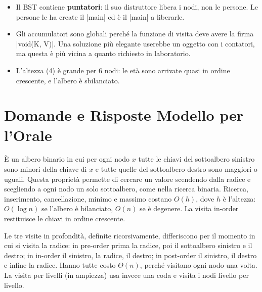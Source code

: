 \begin{consiglio}
\begin{itemize}
  \item Il BST contiene \textbf{puntatori}: il suo distruttore libera i nodi, non le
        persone. Le persone le ha create il \cc|main| ed è il \cc|main| a liberarle.
  \item Gli accumulatori sono globali perché la funzione di visita deve avere la firma
        \cc|void(K, V)|. Una soluzione più elegante userebbe un oggetto con i contatori,
        ma questa è più vicina a quanto richiesto in laboratorio.
  \item L'altezza (4) è grande per 6 nodi: le età sono arrivate quasi in ordine crescente,
        e l'albero è sbilanciato.
\end{itemize}
\end{consiglio}

\section{Domande e Risposte Modello per l'Orale}

\begin{orale}
È un albero binario in cui per ogni nodo $x$ tutte le chiavi del sottoalbero sinistro sono
minori della chiave di $x$ e tutte quelle del sottoalbero destro sono maggiori o uguali.
Questa proprietà permette di cercare un valore scendendo dalla radice e scegliendo a ogni
nodo un solo sottoalbero, come nella ricerca binaria. Ricerca, inserimento, cancellazione,
minimo e massimo costano $O(h)$, dove $h$ è l'altezza: $O(\log n)$ se l'albero è bilanciato,
$O(n)$ se è degenere. La visita in-order restituisce le chiavi in ordine crescente.
\end{orale}

\begin{orale}
Le tre visite in profondità, definite ricorsivamente, differiscono per il momento in cui si
visita la radice: in pre-order prima la radice, poi il sottoalbero sinistro e il destro; in
in-order il sinistro, la radice, il destro; in post-order il sinistro, il destro e infine la
radice. Hanno tutte costo $\Theta(n)$, perché visitano ogni nodo una volta. La visita per
livelli (in ampiezza) usa invece una coda e visita i nodi livello per livello.
\end{orale}

